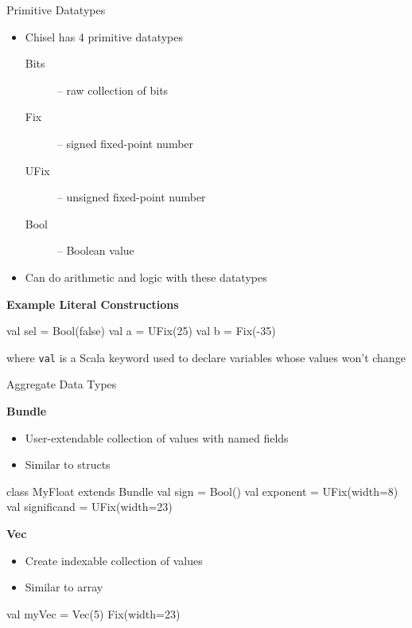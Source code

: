 \documentclass[xcolor=pdflatex,dvipsnames,table]{beamer}
\begin{document}
\begin{frame}[fragile]{Primitive Datatypes}
\begin{itemize}
\item{Chisel has 4 primitive datatypes}
\begin{description}
\item[Bits]  -- raw collection of bits
\item[Fix]   -- signed fixed-point number
\item[UFix] -- unsigned fixed-point number
\item[Bool] -- Boolean value
\end{description}
\item Can do arithmetic and logic with these datatypes
\end{itemize}

\textbf{Example Literal Constructions}
\begin{scala}
val sel = Bool(false)
val a   = UFix(25)
val b   = Fix(-35)
\end{scala}
where \verb+val+ is a Scala keyword used to declare variables whose values won't change
\end{frame}

\begin{frame}[fragile]{Aggregate Data Types}

\textbf{Bundle}

\begin{itemize}
\item User-extendable collection of values with named fields
\item Similar to structs
\end{itemize}

\begin{footnotesize}
\begin{scala}
class MyFloat extends Bundle{
  val sign        = Bool()
  val exponent    = UFix(width=8)
  val significand = UFix(width=23)
}
\end{scala}
\end{footnotesize}

\textbf{Vec}

\begin{itemize}
\item Create indexable collection of values
\item Similar to array
\end{itemize}

\begin{footnotesize}
\begin{scala}
val myVec = Vec(5){ Fix(width=23) }
\end{scala}
\end{footnotesize}

\end{frame}
\end{document}
